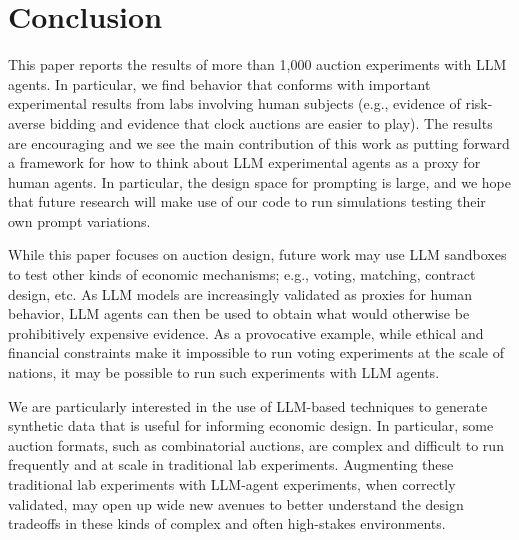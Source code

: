 
\section{Conclusion}\label{sec:conclusion}

This paper reports the results of more than 1,000 auction experiments with LLM agents. 
In particular, we find behavior that conforms with important experimental results from labs involving human
subjects (e.g., evidence of risk-averse bidding and evidence that clock auctions are easier to play). 
The results are encouraging and we see the main contribution of this work as 
 putting forward a framework for how to think about LLM experimental agents as a proxy for human agents. In particular, the design space for prompting is large, and we hope that future research 
 will make  use of our code to run simulations testing their own prompt variations. 

While this paper focuses on auction design, future work may use LLM sandboxes to test other kinds of
economic mechanisms; e.g., voting, matching, contract design, etc.
%
As  LLM models are increasingly validated as
proxies for human behavior, LLM agents can then be used to obtain what would otherwise be prohibitively expensive evidence. 
As a provocative example, while ethical and financial constraints make it impossible to run voting experiments at the scale of nations, it may be possible to run such experiments with LLM agents. 

We are particularly interested in the use of LLM-based techniques to generate synthetic data that is useful for informing 
economic design. 
In particular, some auction formats, such as combinatorial auctions, are complex and  difficult to run frequently and at scale in traditional lab experiments. 
Augmenting these traditional lab experiments with LLM-agent  experiments, when correctly validated, may open up wide new avenues to better understand the design tradeoffs in these kinds of complex and often high-stakes environments. 
